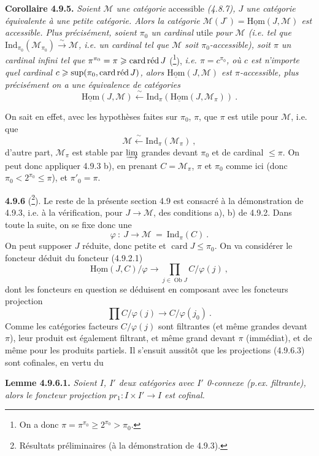 \documentclass[11pt]{article}
\newcommand{\printedpage}[1]{\marginpar{\footnotesize p.~#1}}
\newcommand{\msp}[1]{\marginpar{\footnotesize [#1]}}
\newcommand{\uHom}{\underline{\mathrm{Hom}}}
\newcommand{\Ind}{\mathrm{Ind}}
\newcommand{\Ob}{\operatorname{Ob}}
\newcommand{\card}{\operatorname{card}}
\newcommand{\cardred}{\mathop{\textup{card\,réd}}\nolimits}
\newcommand{\cM}{\mathcal{M}}
\begin{document}
\textbf{Corollaire 4.9.5.} \textit{Soient $\cM$ une catégorie} accessible \textit{(4.8.7), $J$ une catégorie équivalente à une petite catégorie. Alors la catégorie $\cM(J^\circ) = \uHom(J,\cM)$ est accessible. Plus précisément, soient $\pi_0$ un cardinal} utile \textit{pour $\cM$ (i.e. tel que $\Ind_{\pi_0}(\cM_{\pi_0}) \xrightarrow{\sim} \cM$, i.e. un cardinal tel que $\cM$ soit $\pi_0$-accessible), soit $\pi$ un cardinal infini tel que $\pi^{\pi_0} = \pi \geqslant \cardred J$} (\footnote[95]{On a donc $\pi = \pi^{\pi_0} \geqslant 2^{\pi_0} > \pi_0$.}), \textit{i.e. $\pi = c^{\pi_0}$, où $c$ est n'importe quel cardinal $c \geqslant \sup(\pi_0, \cardred J)$, alors $\uHom(J,\cM)$ est $\pi$-accessible, plus précisément on a une équivalence de catégories} %
\[
\uHom(J,\cM) \xleftarrow{\ \sim\ } \Ind_\pi(\uHom(J,\cM_\pi)) \ . \tag*{(4.9.5.1)}
\]

\msp{page 221}On sait en effet, avec les hypothèses faites sur $\pi_0$, $\pi$, que $\pi$ est utile pour $\cM$, i.e. que
\[
\cM \xleftarrow{\ \sim\ } \Ind_\pi(\cM_\pi) \ ,
\]
d'autre part, $\cM_\pi$ est stable par $\varinjlim$ grandes devant $\pi_0$ et de cardinal $\leqslant \pi$. On peut donc appliquer 4.9.3 b), en prenant $C = \cM_\pi$, $\pi$ et $\pi_0$ comme ici (donc $\pi_0 < 2^{\pi_0} \leqslant \pi$), et $\pi'_0 = \pi$.

\printedpage{80}

\textbf{4.9.6} (\footnote[96]{Résultats préliminaires (à la démonstration de 4.9.3).}). Le reste de la présente section 4.9 est consacré à la démonstration de 4.9.3, i.e. à la vérification, pour $J \longrightarrow \cM$, des conditions a), b) de 4.9.2. Dans toute la suite, on se fixe donc une
\[
\varphi \ : \ J \longrightarrow \cM \ = \ \Ind_\pi(C) \ . \tag*{(4.9.6.1)}
\]
On peut supposer $J$ réduite, donc petite et $\card J \leqslant \pi_0$. On va considérer le foncteur déduit du foncteur (4.9.2.1)
\[
\uHom(J,C)/\varphi \longrightarrow \prod_{j \in \Ob J} C/\varphi(j) \ , \tag*{(4.9.6.2)}
\]
dont les foncteurs en question se déduisent en composant avec les foncteurs projection
\[
\prod C/\varphi(j) \longrightarrow C/\varphi(j_0) \ . \tag*{(4.9.6.3)}
\]
Comme les catégories facteurs $C/\varphi(j)$ sont filtrantes (et même grandes devant $\pi$), leur produit est également filtrant, et même grand devant $\pi$ (immédiat), et de même
\msp{page 222}
pour les produits partiels. Il s'ensuit aussitôt que les projections (4.9.6.3) sont cofinales, en vertu du

\textbf{Lemme 4.9.6.1.} \textit{Soient $I$, $I'$ deux catégories avec $I'$ \textup{0}-connexe (p.ex. filtrante), alors le foncteur projection $pr_1 : I \times I' \longrightarrow I$ est cofinal.}
\end{document}
